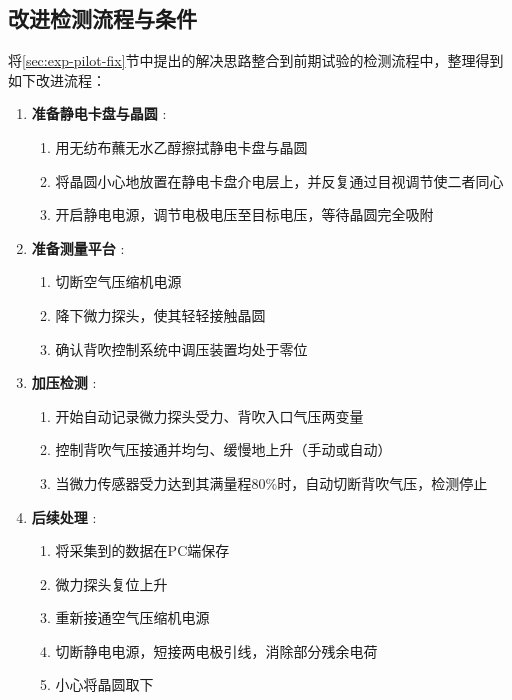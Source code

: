 \subsection{改进检测流程与条件}\label{sec:exp-main-proc}

将\ref{sec:exp-pilot-fix}节中提出的解决思路整合到前期试验的检测流程中，整理得到如下改进流程：

\begin{enumerate}
  \item \textbf{准备静电卡盘与晶圆} :
  \begin{enumerate}
    \item 用无纺布蘸无水乙醇擦拭静电卡盘与晶圆
    \item 将晶圆小心地放置在静电卡盘介电层上，并反复通过目视调节使二者同心
    \item 开启静电电源，调节电极电压至目标电压，等待晶圆完全吸附
  \end{enumerate}
  
  \item \textbf{准备测量平台} :
  \begin{enumerate}
    \item 切断空气压缩机电源
    \item 降下微力探头，使其轻轻接触晶圆
    \item 确认背吹控制系统中调压装置均处于零位
  \end{enumerate}
  
  \item \textbf{加压检测} :
  \begin{enumerate}
    \item 开始自动记录微力探头受力、背吹入口气压两变量
    \item 控制背吹气压接通并均匀、缓慢地上升（手动或自动）
    \item 当微力传感器受力达到其满量程80\%时，自动切断背吹气压，检测停止
  \end{enumerate}
  
  \item \textbf{后续处理} :
  \begin{enumerate}
    \item 将采集到的数据在PC端保存
    \item 微力探头复位上升
    \item 重新接通空气压缩机电源
    \item 切断静电电源，短接两电极引线，消除部分残余电荷
    \item 小心将晶圆取下
  \end{enumerate}
\end{enumerate}

